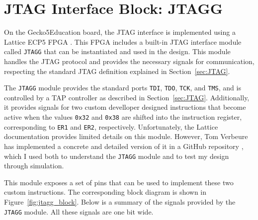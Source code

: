 \documentclass[a4paper,11pt,oneside]{report}
\newcommand{\boardName}{Gecko5Education \xspace}
\begin{document}
\section{JTAG Interface Block: JTAGG}

On the \boardName board, the JTAG interface is implemented using a Lattice ECP5 FPGA \cite{lattice_semiconductor_fpga_2020}.
This FPGA includes a built-in JTAG interface module called \texttt{JTAGG} that can be instantiated and used in the design.
This module handles the JTAG protocol and provides the necessary signals for communication,
respecting the standard JTAG definition explained in Section~\ref{sec:JTAG}.

The \texttt{JTAGG} module provides the standard ports \texttt{TDI}, \texttt{TDO}, \texttt{TCK}, and \texttt{TMS},
and is controlled by a TAP controller as described in Section~\ref{sec:JTAG}.
Additionally, it provides signals for two custom develloper designed instructions that become active when the values
\texttt{0x32} and \texttt{0x38} are shifted into the instruction register,
corresponding to \texttt{ER1} and \texttt{ER2}, respectively.
Unfortunately, the Lattice documentation provides limited details on this module.
However, Tom Verbeure has implemented a concrete and detailed version of it in a GitHub repository \cite{verbeure_tomverbeure/ecp5_jtag_2025},
which I used both to understand the \texttt{JTAGG} module and to test my design through simulation.

This module exposes a set of pins that can be used to implement these two custom instructions.
The corresponding block diagram is shown in Figure~\ref{fig:jtagg_block}.
Below is a summary of the signals provided by the \texttt{JTAGG} module.
All these signals are one bit wide.
\end{document}
